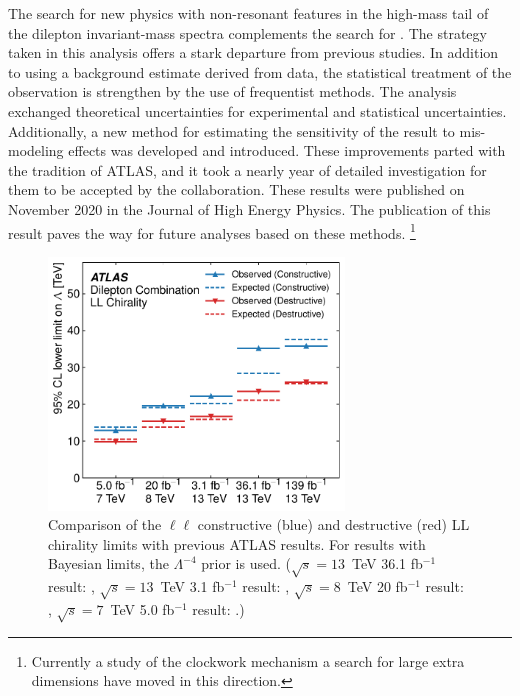 The search for new physics with non-resonant features in the high-mass tail of the dilepton invariant-mass spectra complements the search for \hmm.
The strategy taken in this analysis offers a stark departure from previous studies.
In addition to using a background estimate derived from data, the statistical treatment of the observation is strengthen by the use of frequentist methods.
The analysis exchanged theoretical uncertainties for experimental and statistical uncertainties.
Additionally, a new method for estimating the sensitivity of the result to mis-modeling effects was developed and introduced. 
These improvements parted with the tradition of ATLAS, and it took a nearly year of detailed investigation for them to be accepted by the collaboration.
These results were published on November 2020 in the Journal of High Energy Physics\cite{ciAaron}.
The publication of this result paves the way for future analyses based on these methods.
\footnote{Currently a study of the clockwork mechanism a search for large extra dimensions have moved in this direction.}


\begin{figure}[h!]
\centering
\includegraphics[width=0.70\textwidth]{figures/ci/results/figaux_05.pdf}
\caption{Comparison of the $\ell\ell$ constructive (blue) and destructive (red) LL chirality limits with previous ATLAS results. For results with Bayesian limits, the $\Lambda^{-4}$ prior is used. ($\sqrt{s}=13$~TeV 36.1 fb$^{-1}$ result: \cite{EXOT-2016-05}, $\sqrt{s}=13$~TeV 3.1 fb$^{-1}$ result: \cite{EXOT-2015-07}, $\sqrt{s}=8$~TeV 20 fb$^{-1}$ result: \cite{EXOT-2013-19}, $\sqrt{s}=7$~TeV 5.0 fb$^{-1}$ result: \cite{EXOT-2012-17}.)}
\label{fig:ciAtlasHistoricalLimits}
\end{figure}

